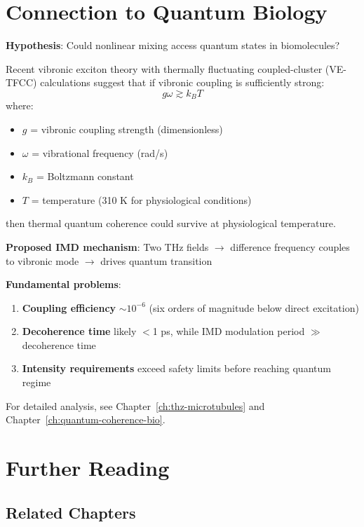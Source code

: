 \section{Connection to Quantum Biology}

\textbf{Hypothesis}: Could nonlinear mixing access quantum states in biomolecules?

Recent vibronic exciton theory with thermally fluctuating coupled-cluster (VE-TFCC) calculations suggest that if vibronic coupling is sufficiently strong:
\begin{equation}
\label{eq:vibronic-condition}
g\omega \gtrsim k_B T
\end{equation}
where:
\begin{itemize}
\item $g$ = vibronic coupling strength (dimensionless)
\item $\omega$ = vibrational frequency (rad/s)
\item $k_B$ = Boltzmann constant
\item $T$ = temperature (310 K for physiological conditions)
\end{itemize}
then thermal quantum coherence could survive at physiological temperature.

\textbf{Proposed IMD mechanism}: Two THz fields $\rightarrow$ difference frequency couples to vibronic mode $\rightarrow$ drives quantum transition

\textbf{Fundamental problems}:
\begin{enumerate}
\item \textbf{Coupling efficiency} $\sim 10^{-6}$ (six orders of magnitude below direct excitation)
\item \textbf{Decoherence time} likely $<$1 ps, while IMD modulation period $\gg$ decoherence time
\item \textbf{Intensity requirements} exceed safety limits before reaching quantum regime
\end{enumerate}

For detailed analysis, see Chapter~\ref{ch:thz-microtubules} and Chapter~\ref{ch:quantum-coherence-bio}.

\section{Further Reading}

\subsection*{Related Chapters}

